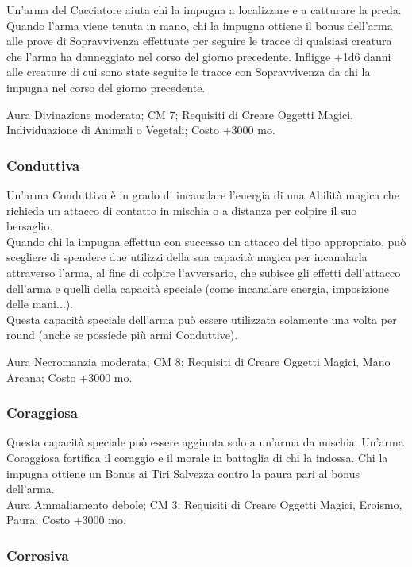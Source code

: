 \begin{multicols}{2}
Un'arma del Cacciatore aiuta chi la impugna a localizzare e a catturare la preda. Quando l'arma viene tenuta in mano, chi la impugna ottiene il bonus dell'arma alle prove di Sopravvivenza effettuate per seguire le tracce di qualsiasi creatura che l'arma ha danneggiato nel corso del giorno precedente. Infligge +1d6 danni alle creature di cui sono state seguite le tracce con Sopravvivenza da chi la impugna nel corso del giorno precedente.

Aura Divinazione moderata; CM 7; Requisiti di Creare Oggetti Magici, Individuazione di Animali o Vegetali; Costo +3000 mo.

\subsubsection{Conduttiva}

Un'arma Conduttiva è in grado di incanalare l'energia di una Abilità magica che richieda un attacco di contatto in mischia o a distanza per colpire il suo bersaglio. \\
Quando chi la impugna effettua con successo un attacco del tipo appropriato, può scegliere di spendere due utilizzi della sua capacità magica per incanalarla attraverso l'arma, al fine di colpire l'avversario, che subisce gli effetti dell'attacco dell'arma e quelli della capacità speciale (come incanalare energia, imposizione delle mani...).\\
Questa capacità speciale dell'arma può essere utilizzata solamente una volta per round (anche se possiede più armi Conduttive).

Aura Necromanzia moderata; CM 8; Requisiti di Creare Oggetti Magici, Mano Arcana; Costo +3000 mo.


\subsubsection{Coraggiosa}

Questa capacità speciale può essere aggiunta solo a un'arma da mischia. Un'arma Coraggiosa fortifica il coraggio e il morale in battaglia di chi la indossa. Chi la impugna ottiene un Bonus ai Tiri Salvezza contro la paura pari al bonus dell'arma.\\ 

Aura Ammaliamento debole; CM 3; Requisiti di Creare Oggetti Magici, Eroismo, Paura; Costo +3000 mo.

\subsubsection{Corrosiva}


\end{multicols}
